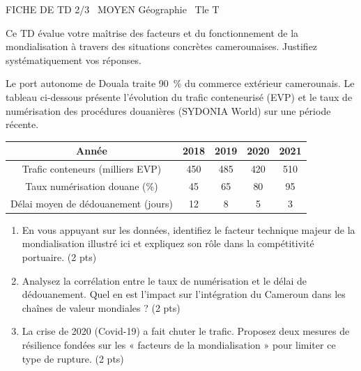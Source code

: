 \documentclass[11pt]{article}
\begin{document}
\begin{tcolorbox}[enhanced,colback=popink,colframe=popink,arc=10pt,boxrule=0pt,left=12pt,right=12pt,top=9pt,bottom=9pt]
{\color{white}\popxbold\small FICHE DE TD 2/3 \textbullet\ MOYEN \hfill Géographie \textbullet\ Tle T\par}
\end{tcolorbox}
\vspace{4pt}
Ce TD évalue votre maîtrise des facteurs et du fonctionnement de la mondialisation à travers des situations concrètes camerounaises. Justifiez systématiquement vos réponses.

\begin{exercice}
Le port autonome de Douala traite \SI{90}{\percent} du commerce extérieur camerounais. Le tableau ci-dessous présente l'évolution du trafic conteneurisé (EVP) et le taux de numérisation des procédures douanières (SYDONIA World) sur une période récente.

\begin{center}
\begin{tabular}{|c|c|c|c|c|}
\hline
\textbf{Année} & \textbf{2018} & \textbf{2019} & \textbf{2020} & \textbf{2021} \\
\hline
Trafic conteneurs (milliers EVP) & 450 & 485 & 420 & 510 \\
\hline
Taux numérisation douane (\%) & 45 & 65 & 80 & 95 \\
\hline
Délai moyen de dédouanement (jours) & 12 & 8 & 5 & 3 \\
\hline
\end{tabular}
\end{center}

\begin{enumerate}
    \item En vous appuyant sur les données, identifiez le facteur technique majeur de la mondialisation illustré ici et expliquez son rôle dans la compétitivité portuaire. (2 pts)
    \item Analysez la corrélation entre le taux de numérisation et le délai de dédouanement. Quel en est l'impact sur l'intégration du Cameroun dans les chaînes de valeur mondiales ? (2 pts)
    \item La crise de 2020 (Covid-19) a fait chuter le trafic. Proposez deux mesures de résilience fondées sur les « facteurs de la mondialisation » pour limiter ce type de rupture. (2 pts)
\end{enumerate}
\end{exercice}
\end{document}
